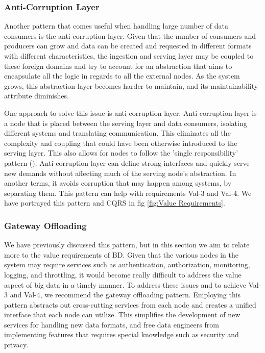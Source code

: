 \documentclass[conference]{IEEEtran}
\begin{document}
\subsubsection{Anti-Corruption Layer}

Another pattern that comes useful when handling large number of data consumers is the anti-corruption layer. Given that the number of consumers and producers can grow and data can be created and requested in different formats with different characteristics, the ingestion and serving layer may be coupled to these foreign domains and try to account for an abstraction that aims to encapsulate all the logic in regards to all the external nodes. As the system grows, this abstraction layer becomes harder to maintain, and its maintainability attribute diminishes. 

One approach to solve this issue is anti-corruption layer. Anti-corruption layer is a node that is placed between the serving layer and data consumers, isolating different systems and translating communication. This eliminates all the complexity and coupling that could have been otherwise introduced to the serving layer. This also allows for nodes to follow the 'single responsibility' pattern (\cite{gamma1995design}). Anti-corruption layer can define strong interfaces and quickly serve new demands without affecting much of the serving node's abstraction. In another terms, it avoids corruption that may happen among systems, by separating them. This pattern can help with requirements Val-3 and Val-4. We have portrayed this pattern and CQRS in fig \ref{fig:Value Requirements}.

\subsubsection{Gateway Offloading}

We have previously discussed this pattern, but in this section we aim to relate more to the value requirements of BD. Given that the various nodes in the system may require services such as authentication, authorization, monitoring, logging, and throttling, it would become really difficult to address the value aspect of big data in a timely manner. To address these issues and to achieve Val-3 and Val-4, we recommend the gateway offloading pattern. Employing this pattern abstracts out cross-cutting services from each node and creates a unified interface that each node can utilize. This simplifies the development of new services for handling new data formats, and free data engineers from implementing features that requires special knowledge such as security and privacy. 
\end{document}
